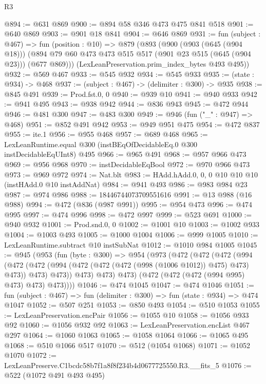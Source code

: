 \begin{lexlean}{R3}
\begin{coremodule}
@894 := @631 @869
@900 := @894 @58 @346 @473 @475 @841 @518
@901 := @640 @869
@903 := @901 @18 @841
@904 := @646 @869
@931 := fun (subject : @467) =>
  fun (position : @10) =>
  @879
    (@893
      (@900
        (@903 (@645 (@904 @18)))
        (@894 @79 @60 @473 @473 @515 @517 (@901 @23 @515 (@645 (@904 @23))) (@677 @869)))
      (LexLeanPreservation.prim_index_bytes @493 @495))
@932 := @569 @467
@933 := @545 @932
@934 := @545 @933
@935 := (state : @934) -> @468
@937 := (subject : @467) -> (delimiter : @300) -> @935
@938 := @845 @491
@939 := Prod.fst.{0, 0}
@940 := @939 @10
@941 := @940 @933
@942 := @941 @495
@943 := @938 @942
@944 := @836 @943
@945 := @472 @944
@946 := @481 @300
@947 := @483 @300
@949 := @946 (fun ("_" : @947) => @468)
@951 := @852 @491 @942
@953 := @949 @951 @475
@954 := @472 @837
@955 := ite.{1}
@956 := @955 @468
@957 := @689 @468
@965 := LexLeanRuntime.equal @300 (instBEqOfDecidableEq.{0} @300 instDecidableEqUInt8) @495
@966 := @965 @491
@968 := @957 @966 @473
@969 := @956 @968
@970 := instDecidableEqBool
@972 := @970 @966 @473
@973 := @969 @972
@974 := Nat.blt
@983 := HAdd.hAdd.{0, 0, 0} @10 @10 @10 (instHAdd.{0} @10 instAddNat)
@984 := @941 @493
@986 := @983 @984 @23
@987 := @974 @986
@988 := 18446744073709551616
@991 := @13 @988 (@16 @988)
@994 := @472 (@836 (@987 @991))
@995 := @954 @473
@996 := @474 @995
@997 := @474 @996
@998 := @472 @997
@999 := @523 @691
@1000 := @940 @932
@1001 := Prod.snd.{0, 0}
@1002 := @1001 @10
@1003 := @1002 @933
@1004 := @1003 @493
@1005 := @1000 @1004
@1006 := @999 @1005
@1010 := LexLeanRuntime.subtract @10 instSubNat
@1012 := @1010 @984 @1005
@1045 := @945
    (@953
      (fun (byte : @300) =>
      @954
        (@973
          (@472
            (@472
              (@472
                (@994
                  (@472
                    (@472 (@994 (@472 (@472 (@472 (@998 (@1006 @1012)) @475) @473) @473)) @473)
                    @473))
                @473)
              @473)
            @473)
          (@472 (@472 (@472 (@994 @995) @473) @473) @473))))
@1046 := @474 @1045
@1047 := @474 @1046
@1051 := fun (subject : @467) => fun (delimiter : @300) => fun (state : @934) => @474 @1047
@1052 := @507 @251
@1053 := @850 @493
@1054 := @510 @1053
@1055 := LexLeanPreservation.encPair
@1056 := @1055 @10
@1058 := @1056 @933 @92
@1060 := @1056 @932 @92
@1063 := LexLeanPreservation.encList @467 @297
@1064 := @1060 @1063
@1065 := @1058 @1064
@1066 := @1065 @495
@1068 := @510 @1066 @517
@1070 := @512 (@1054 @1068)
@1071 := @1052 @1070
@1072 := LexLeanPreserve.C1bcdc58b7f1a8f8f234b4d0677725550.R3.__fits_5
@1076 := @522 (@1072 @491 @493 @495)

\end{coremodule}
\end{lexlean}
